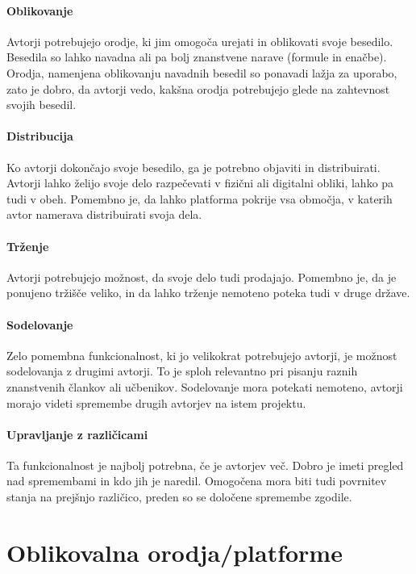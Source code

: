 \documentclass[a4paper, 12pt]{book}
\begin{document}
\paragraph{Oblikovanje}
Avtorji potrebujejo orodje, ki jim omogoča urejati in oblikovati svoje besedilo. Besedila so lahko navadna ali pa bolj znanstvene narave (formule in enačbe). Orodja, namenjena oblikovanju navadnih besedil so ponavadi lažja za uporabo, zato je dobro, da avtorji vedo, kakšna orodja potrebujejo glede na zahtevnost svojih besedil.


\paragraph{Distribucija}
Ko avtorji dokončajo svoje besedilo, ga je potrebno objaviti in distribuirati. Avtorji lahko želijo svoje delo razpečevati v fizični ali digitalni obliki, lahko pa tudi v obeh. Pomembno je, da lahko platforma pokrije vsa območja, v katerih avtor namerava distribuirati svoja dela.

\paragraph{Trženje}
Avtorji potrebujejo možnost, da svoje delo tudi prodajajo. Pomembno je, da je ponujeno tržišče veliko, in da lahko trženje nemoteno poteka tudi v druge države.

\paragraph{Sodelovanje}
Zelo pomembna funkcionalnost, ki jo velikokrat potrebujejo avtorji, je možnost sodelovanja z drugimi avtorji. To je sploh relevantno pri pisanju raznih znanstvenih člankov ali učbenikov. Sodelovanje mora potekati nemoteno, avtorji morajo videti spremembe drugih avtorjev na istem projektu.

\paragraph{Upravljanje z različicami}
Ta funkcionalnost je najbolj potrebna, če je avtorjev več. Dobro je imeti pregled nad spremembami in kdo jih je naredil. Omogočena mora biti tudi povrnitev stanja na prejšnjo različico, preden so se določene spremembe zgodile.

\section{Oblikovalna orodja/platforme} 
\end{document}
